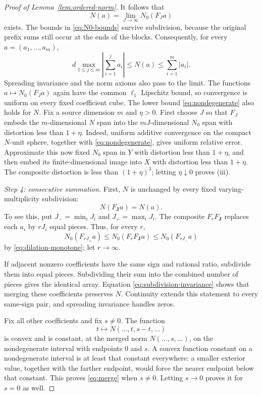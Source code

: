 \documentclass[11pt]{article}
\theoremstyle{definition}
\theoremstyle{remark}
\newcommand{\abs}[1]{\left\lvert #1\right\rvert}
\begin{document}
\begin{proof}[Proof of Lemma~\ref{lem:ordered-norm}]
It follows that
\begin{equation}\label{eq:N-definition}
 N(a)=\lim_{J\to\infty}N_0(F_Ja)
\end{equation}
exists. The bounds in \eqref{eq:N0-bounds} survive subdivision, because
the original prefix sums still occur at the ends of the blocks.
Consequently, for every $a=(a_1,\ldots,a_m)$,
\begin{equation}\label{eq:prefix-bounds}
 d\max_{1\leq j\leq m}\abs{\sum_{i=1}^j a_i}
 \leq N(a)\leq\sum_{i=1}^m|a_i|.
\end{equation}
Spreading invariance and the norm axioms also pass to the limit.
The functions $a\mapsto N_0(F_Ja)$ again have the common $\ell_1$
Lipschitz bound, so convergence is uniform on every fixed coefficient
cube. The lower bound \eqref{eq:nondegenerate} also holds for $N$.
Fix a source dimension $m$ and $\eta>0$. First choose $J$ so that $F_J$
embeds the $m$-dimensional $N$ span into the $mJ$-dimensional $N_0$ span
with distortion less than $1+\eta$.
Indeed, uniform additive convergence on the compact $N$-unit sphere,
together with \eqref{eq:nondegenerate}, gives uniform relative error.
Approximate this now fixed $N_0$ span in $Y$ with distortion less than
$1+\eta$, and then embed its finite-dimensional image into $X$ with
distortion less than $1+\eta$. The composite distortion is less than
$(1+\eta)^3$; letting $\eta\downarrow0$ proves \textup{(iii)}.

\par\smallskip
{}
\noindent\emph{Step 4: consecutive summation.}
First, $N$ is unchanged by every fixed varying-multiplicity subdivision:
\begin{equation}\label{eq:subdivision-invariance}
 N(F_{\boldsymbol J}a)=N(a).
\end{equation}
To see this, put $J_- =\min_iJ_i$ and $J_+=\max_iJ_i$.
The composite $F_rF_{\boldsymbol J}$ replaces each $a_i$ by $rJ_i$
equal pieces. Thus, for every $r$,
\[
 N_0(F_{rJ_+}a)
 \leq N_0(F_rF_{\boldsymbol J}a)
 \leq N_0(F_{rJ_-}a)
\]
by \eqref{eq:dilation-monotone}; let $r\to\infty$.

If adjacent nonzero coefficients have the same sign and rational ratio,
subdivide them into equal pieces. Subdividing their sum into the combined
number of pieces gives the identical array. Equation
\eqref{eq:subdivision-invariance} shows that merging these coefficients
preserves $N$. Continuity extends this statement to every same-sign
pair, and spreading invariance handles zeros.

Fix all other coefficients and fix $s\ne0$. The function
\[
 t\longmapsto N(\ldots,t,s-t,\ldots)
\]
is convex and is constant, at the merged norm $N(\ldots,s,\ldots)$,
on the nondegenerate interval with endpoints $0$ and $s$.
A convex function constant on a nondegenerate interval is at least that
constant everywhere: a smaller exterior value, together with the farther
endpoint, would force the nearer endpoint below that constant.
This proves \eqref{eq:merge} when $s\ne0$.
Letting $s\to0$ proves it for $s=0$ as well.
\end{proof}

\clearpage
{}

\end{document}
